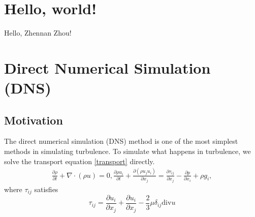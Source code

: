 \documentclass[english, nochinese]{pkupaper}
\title{\titlemark}
\author{\authoring}
\begin{document}
\maketitle

\section{Hello, world!}

Hello, Zhennan Zhou!

\section{Direct Numerical Simulation (DNS)}
\subsection{Motivation}
\par The direct numerical simulation (DNS) method is one of the most simplest methods in simulating turbulence. To simulate what happens in turbulence, we solve the transport equation \ref{transport} directly. \begin{equation}\label{transport}
	\begin{aligned}
		\frac{\partial\rho}{\partial t} + \nabla\cdot(\rho u) = 0,
		\frac{\partial\rho u_i}{\partial t} + \frac{\partial(\rho u_ju_i)}{\partial x_j} = \frac{\partial\tau_{ij}}{\partial x_j} - \frac{\partial p}{\partial x_i} + \rho g_i,
	\end{aligned}
\end{equation}
where $\tau_{ij}$ satisfies
\begin{equation}
	\tau_{ij} = \frac{\partial u_i}{\partial x_j} + \frac{\partial u_i}{\partial x_j} - \frac{2}{3}\mu\delta_{ij}\mathrm{div} u
\end{equation}
\end{document}
